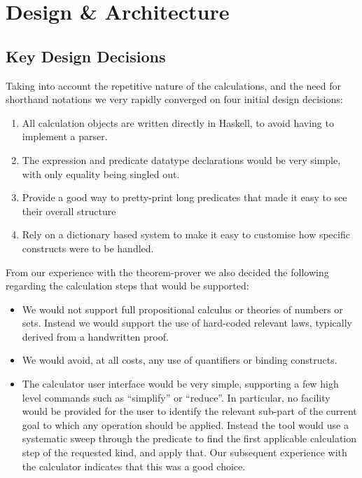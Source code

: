 \section{Design \& Architecture}\label{sec:Design}

\subsection{Key Design Decisions}

Taking into account the repetitive nature of the calculations,
and the need for shorthand notations we very rapidly converged
on four initial design decisions:
\begin{enumerate}
  \item All calculation objects are written
  directly in Haskell, to avoid having to implement a parser.
  \item The expression and predicate datatype declarations
   would be very simple, with only equality being singled out.
  \item Provide a good way to pretty-print long predicates
    that made it easy to see their overall structure
  \item Rely on a dictionary based system to
    make it easy to customise how specific constructs
    were to be handled.
\end{enumerate}
From our experience with the  theorem-prover we also decided
the following regarding the calculation steps that would be supported:
\begin{itemize}
  \item
    We would not support full  propositional calculus
    or theories of numbers or sets.
    Instead we would support the use of hard-coded relevant laws,
    typically derived from a handwritten proof.
  \item
    We would avoid, at all costs,
    any use of quantifiers or binding constructs.
  \item
    The calculator user interface would be very simple,
    supporting a few high level commands such as ``simplify''
    or ``reduce''.
    In particular,
    no facility would be provided for the user to identify
    the relevant sub-part of the current goal to which any operation
    should be applied.
    Instead the tool would use a systematic sweep through the predicate
    to find the first applicable calculation step of the requested kind,
    and apply that.
    Our subsequent experience with the calculator indicates
    that this was a good choice.
\end{itemize}


